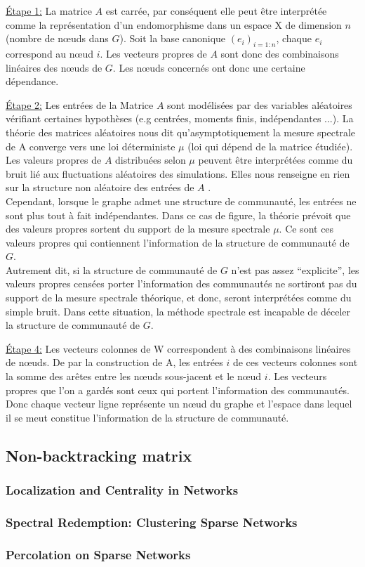 \par{\underline{Étape 1:}}
La matrice $A$ est carrée, par conséquent elle peut être interprétée comme la représentation d'un endomorphisme dans un espace X de dimension $n$ (nombre de nœuds dans $G$).
Soit la base canonique $(e_i)_{i=1:n}$, chaque $e_i$ correspond au nœud $i$.
Les vecteurs propres de $A$ sont donc des combinaisons linéaires des nœuds de $G$.
Les nœuds concernés ont donc une certaine dépendance.
\par{\underline{Étape 2:}}
Les entrées de la Matrice $A$ sont modélisées par des variables aléatoires vérifiant certaines hypothèses (e.g centrées, moments finis, indépendantes ...).
La théorie des matrices aléatoires nous dit qu’asymptotiquement la mesure spectrale de A converge vers une loi déterministe $\mu$ (loi qui dépend de la matrice étudiée).
Les valeurs propres de $A$ distribuées selon $\mu$ peuvent être interprétées comme du bruit lié aux fluctuations aléatoires des simulations.
Elles nous renseigne en rien sur la structure non aléatoire des entrées de $A$ .\\
Cependant, lorsque le graphe admet une structure de communauté, les entrées ne sont plus tout à fait indépendantes.
Dans ce cas de figure, la théorie prévoit que des valeurs propres sortent du support de la mesure spectrale $\mu$.
Ce sont ces valeurs propres qui contiennent l'information de la structure de communauté de $G$.\\
Autrement dit, si la structure de communauté de $G$ n'est pas assez ``explicite'', les valeurs propres censées porter l'information des communautés ne sortiront pas du support de la mesure spectrale théorique, et donc, seront interprétées comme du simple bruit.
Dans cette situation, la méthode spectrale est incapable de déceler la structure de communauté de $G$.
\par{\underline{Étape 4:}}
Les vecteurs colonnes de W correspondent à des combinaisons linéaires de nœuds.
De par la construction de A, les entrées $i$ de ces vecteurs colonnes sont la somme des arêtes entre les nœuds sous-jacent et le nœud $i$.
Les vecteurs propres que l'on a gardés sont ceux qui portent l'information des communautés.
Donc chaque vecteur ligne représente un nœud du graphe et l'espace dans lequel il se meut constitue l'information de la structure de communauté. 

\subsection{Non-backtracking matrix}
\subsubsection{Localization and Centrality in Networks }
\subsubsection{Spectral Redemption: Clustering Sparse Networks}
\subsubsection{Percolation on Sparse Networks}
